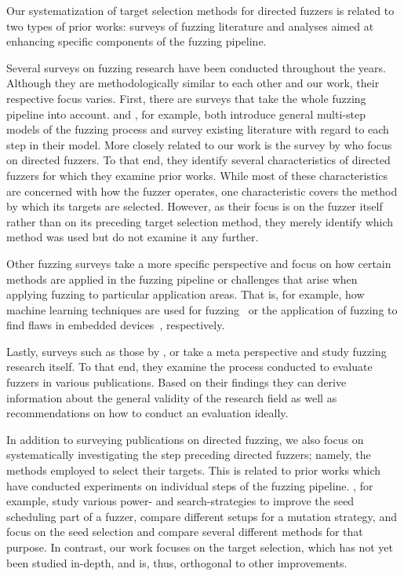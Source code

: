Our systematization of target selection methods for directed fuzzers is related to two types of prior works: surveys of fuzzing literature and analyses aimed at enhancing specific components of the fuzzing pipeline.

Several surveys on fuzzing research have been conducted throughout the years. Although they are methodologically similar to each other and our work, their respective focus varies. First, there are surveys that take the whole fuzzing pipeline into account. \citet{ManHanHanCha+21} and \citet{LiaPeiJiaShe+18}, for example, both introduce general multi-step models of the fuzzing process and survey existing literature with regard to each step in their model. More closely related to our work is the survey by \citet{WanZhoYueLin+24} who focus on directed fuzzers. To that end, they identify several characteristics of directed fuzzers for which they examine prior works. While most of these characteristics are concerned with how the fuzzer operates, one characteristic covers the method by which its targets are selected. However, as their focus is on the fuzzer itself rather than on its preceding target selection method, they merely identify which method was used but do not examine it any further.

Other fuzzing surveys take a more specific perspective and focus on how certain methods are applied in the fuzzing pipeline or challenges that arise when applying fuzzing to particular application areas. That is, for example, how machine learning techniques are used for fuzzing~\cite{SavRodDun+19, WanJiaLiuHua+20} or the application of fuzzing to find flaws in embedded devices~\cite{MueStiKarFra+18, EisMauShrHut+22}, respectively. 

Lastly, surveys such as those by \citet{SchBarSchBer+24}, \citet{KleRueCooWei+18} or \citet{KimChoImHeo+24} take a meta perspective and study fuzzing research itself. To that end, they examine the process conducted to evaluate fuzzers in various publications. Based on their findings they can derive information about the general validity of the research field as well as recommendations on how to conduct an evaluation ideally.

In addition to surveying publications on directed fuzzing, we also focus on systematically investigating the step preceding directed fuzzers; namely, the methods employed to select their targets. This is related to prior works which have conducted experiments on individual steps of the fuzzing pipeline. \citet{BöhPhaRoy16}, for example, study various power- and search-strategies to improve the seed scheduling part of a fuzzer, \citet{WuJiaXiaHua+22} compare different setups for a mutation strategy, and \citet{HerGunMagSha+21} focus on the seed selection and compare several different methods for that purpose. In contrast, our work focuses on the target selection, which has not yet been studied in-depth, and is, thus, orthogonal to other improvements.